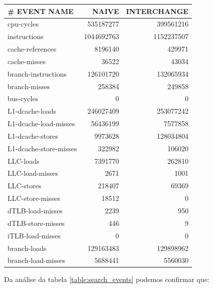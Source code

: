 \documentclass[conference,compsoc]{IEEEtran}
\begin{document}
\begin{itemize}
\begin{table}[H]
\begin{tabular}{ | l | r | r |   }
  \hline
  \# EVENT NAME	 & NAIVE  & INTERCHANGE \\ \hline 
  cpu-cycles  & 535187277  & 399561216         \\ \hline       
  instructions &       1044692763 &      1152237507      \\ \hline
  cache-references &      8196140 &    429971      \\ \hline
  cache-misses     &    36522 &     43034      \\ \hline
  branch-instructions & 126101720 & 132065934      \\ \hline
  branch-misses     &   258384 &  249858      \\ \hline
  bus-cycles       &       0 &    0      \\ \hline
   L1-dcache-loads  &  246027409 & 253077242     \\ \hline
 L1-dcache-load-misses & 56436199 & 7577858   \\ \hline
  L1-dcache-stores   &  9973628 & 128034804     \\ \hline
  L1-dcache-store-misses & 322982 &  106020     \\ \hline
  LLC-loads           &    7391770 & 262810     \\ \hline
  LLC-load-misses      &  2671 &  1001     \\ \hline
  LLC-stores          &  218407 & 69369     \\ \hline
  LLC-store-misses    &   18512 &    0     \\ \hline
  dTLB-load-misses    &   2239 & 950     \\ \hline
  dTLB-store-misses   &    446 &  9     \\ \hline
  iTLB-load-misses   &   0 &   0     \\ \hline
  branch-loads   & 129163483 & 129898962  \\ \hline    
  branch-load-misses &  5688441 & 5560030      \\ \hline
  \end{tabular}
  \end{table}
  

Da análise da tabela   \ref{table:search_events} podemos confirmar que:


\end{itemize}
\end{document}
